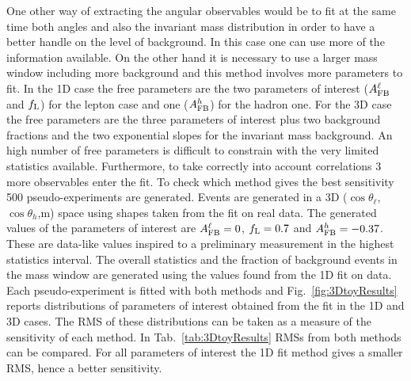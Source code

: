 One other way of extracting the angular observables would be to fit at the same time both angles 
and also the invariant mass distribution in order to have a better handle on the level of background.
In this case one can use more of the information available. On the other hand it is necessary to use 
a larger mass window including more background and this method involves more parameters to fit.
In the 1D case the free parameters are the two parameters of interest ($A_{\rm FB}^\ell$ and $f_{\rm L}$)
for the lepton case and one ($A_{\rm FB}^h$)
for the hadron one. For the 3D case the free parameters are the three parameters of interest 
plus two background fractions and the two exponential slopes for the invariant mass background.
An high number of free parameters is difficult to constrain with the very limited statistics available.
Furthermore, to take correctly into account correlations 3 more observables enter the fit. 
%
To check which method gives the best sensitivity 500 pseudo-experiments are generated.
Events are generated in a 3D ($\cos\theta_\ell$,$\cos\theta_h$,m) space using shapes taken from the fit on real data.
The generated values of the parameters of interest are $A_{\rm FB}^\ell = 0$, $f_{\rm L} = 0.7$ 
and $A_{\rm FB}^h = -0.37$. These are data-like values inspired to a preliminary measurement
in the highest statistics interval. The overall statistics and the fraction of background events in the mass
window are generated using the values found from the 1D fit on data.
Each pseudo-experiment is fitted with both methods and Fig.~\ref{fig:3DtoyResults} reports 
distributions of parameters of interest obtained from the fit in the 1D and 3D cases.
The RMS of these distributions can be taken as a measure of the sensitivity of each method.
In Tab.~\ref{tab:3DtoyResults} RMSs from both methods can be compared. For all parameters 
of interest the 1D fit method gives a smaller RMS, hence a better sensitivity.
%
